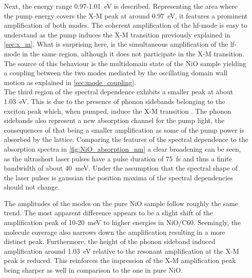 Next, the energy range 0.97-\qty{1.01}{eV} is described.
Representing the area where the pump energy covers the X-M peak at around \qty{0.97}{eV},
it features a prominent amplification of both modes.
The coherent amplification of the hf-mode is easy to understand as the pump induces the X-M transition previously explained in \autoref{sec:x_m}.
What is surprising here, is the simultaneous amplification of the lf-mode in the same region, although it does not participate in the X-M transition.
The source of this behaviour is the multidomain state of the NiO sample yielding a coupling between the two modes mediated by the oscillating domain wall motion as explained in \autoref{sec:mode_coupling}. \\
The third region of the spectral dependence exhibits a smaller peak at about \qty{1.03}{eV}.
This is due to the presence of phonon sidebands belonging to the exciton peak which, when pumped, induce the X-M transition .
The phonon sidebands also represent a new absorption channel for the pump light, the consequences of that being a smaller amplification as some of the pump power is absorbed by the lattice.
Comparing the features of the spectral dependence to the absorption spectra in \autoref{fig:NiO_absorption_nm} a clear broadening can be seen, as the ultrashort laser pulses have a pulse duration of \qty{75}{fs} and thus a finite bandwidth of about \qty{40}{meV}.
Under the assumption that the spectral shape of the laser pulses is gaussian the position maxima of the spectral dependencies should not change.

The amplitudes of the modes on the pure NiO sample follow roughly the same trend.
The most apparent difference appears to be a slight shift of the amplification peak of 10-\qty{20}{meV} to higher energies in NiO/C60.
Seemingly, the molecule coverage also narrows down the amplification resulting in a more distinct peak.
Furthermore, the height of the phonon sideband induced amplification around \qty{1.03}{eV} relative to the resonant amplification at the X-M peak is reduced.
This reinforces the impression of the X-M amplification peak being sharper as well in comparison to the one in pure NiO.

